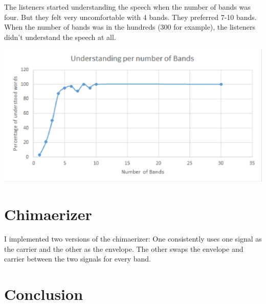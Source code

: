\documentclass[11pt]{article}
\begin{document}
The listeners started understanding the speech when the number of bands was four.
But they felt very uncomfortable with 4 bands. They preferred 7-10 bands.\\

When the number of bands was in the hundreds (300 for example),
the listeners didn't understand the speech at all.

\includegraphics[width=\textwidth]{output/experiment.png}

\section{Chimaerizer}
I implemented two versions of the chimaerizer:
One consistently uses one signal as the carrier and the other
as the envelope.
The other swaps the envelope and carrier between the two signals for 
every band.\\




\section{Conclusion}
\end{document}
